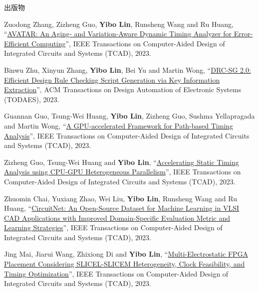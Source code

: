 \begin{rSection}{出版物}
\begin{description}[font=\normalfont, rightmargin=2em]
{}
            

\item[{[J50]}]{
        Zuodong Zhang, Zizheng Guo, \textbf{Yibo Lin}, Runsheng Wang and Ru Huang, 
    ``\href{https://doi.org/10.1109/TCAD.2023.3255167}{AVATAR: An Aging- and Variation-Aware Dynamic Timing Analyzer for Error-Efficient Computing}'', 
    IEEE Transactions on Computer-Aided Design of Integrated Circuits and Systems (TCAD), 2023.
    
}
            

\item[{[J49]}]{
        Binwu Zhu, Xinyun Zhang, \textbf{Yibo Lin}, Bei Yu and Martin Wong, 
    ``\href{https://doi.org/10.1145/3594666}{DRC-SG 2.0: Efficient Design Rule Checking Script Generation via Key Information Extraction}'', 
    ACM Transactions on Design Automation of Electronic Systems (TODAES), 2023.
    
}
            

\item[{[J48]}]{
        Guannan Guo, Tsung-Wei Huang, \textbf{Yibo Lin}, Zizheng Guo, Sushma Yellapragada and Martin Wong, 
    ``\href{https://doi.org/10.1109/TCAD.2023.3272274}{A GPU-accelerated Framework for Path-based Timing Analysis}'', 
    IEEE Transactions on Computer-Aided Design of Integrated Circuits and Systems (TCAD), 2023.
    
}
            

\item[{[J47]}]{
        Zizheng Guo, Tsung-Wei Huang and \textbf{Yibo Lin}, 
    ``\href{https://doi.org/10.1109/TCAD.2023.3286261}{Accelerating Static Timing Analysis using CPU-GPU Heterogeneous Parallelism}'', 
    IEEE Transactions on Computer-Aided Design of Integrated Circuits and Systems (TCAD), 2023.
    
}
            

\item[{[J46]}]{
        Zhuomin Chai, Yuxiang Zhao, Wei Liu, \textbf{Yibo Lin}, Runsheng Wang and Ru Huang, 
    ``\href{https://doi.org/10.1109/TCAD.2023.3287970}{CircuitNet: An Open-Source Dataset for Machine Learning in VLSI CAD Applications with Improved Domain-Specific Evaluation Metric and Learning Strategies}'', 
    IEEE Transactions on Computer-Aided Design of Integrated Circuits and Systems (TCAD), 2023.
    
}
            

\item[{[J45]}]{
        Jing Mai, Jiarui Wang, Zhixiong Di and \textbf{Yibo Lin}, 
    ``\href{https://doi.org/10.1109/TCAD.2023.3313101}{Multi-Electrostatic FPGA Placement Considering SLICEL-SLICEM Heterogeneity, Clock Feasibility, and Timing Optimization}'', 
    IEEE Transactions on Computer-Aided Design of Integrated Circuits and Systems (TCAD), 2023.
    
}
\end{description}
\end{rSection}
